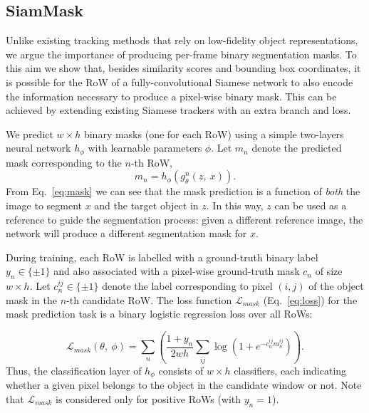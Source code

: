 \documentclass[10pt,twocolumn,letterpaper]{article}
\newcommand{\mypar}[1]{\smallskip\noindent {\bf #1}\enskip}
\begin{document}
\subsection{SiamMask}
\label{sec:siammask}
Unlike existing tracking methods that rely on low-fidelity object representations, we argue the importance of producing per-frame binary segmentation masks.
To this aim we show that, besides similarity scores and bounding box coordinates, it is possible for the RoW of a fully-convolutional Siamese network to also encode the information necessary to produce a pixel-wise binary mask.
This can be achieved by extending existing Siamese trackers with an extra branch and loss.

We predict $w{\times}h$ binary masks (one for each RoW) using a simple two-layers neural network $h_{\phi}$ with learnable parameters $\phi$.
Let $m_{n}$ denote the predicted mask corresponding to the $n$-th RoW,
\begin{equation}\label{eq:mask}
m_{n} = h_{\phi}(g_{\theta}^{n}(z,~x)).
\end{equation}
From Eq.~\ref{eq:mask} we can see that the mask prediction is a function of \emph{both} the image to segment $x$ and the target object in $z$.
In this way, $z$ can be used as a reference to guide the segmentation process:
given a different reference image, the network will produce a different segmentation mask for $x$.

\mypar{Loss function.}
During training, each RoW is labelled with a ground-truth binary label $y_{n} \in \{\pm 1\}$ and also associated with a pixel-wise ground-truth mask $c_n$ of size $w{\times}h$.
Let $c^{ij}_{n} \in \{\pm 1\}$ denote the label corresponding to pixel $(i,j)$ of the object mask in the $n$-th candidate RoW.
The loss function $\mathcal{L}_{mask}$ (Eq.~\ref{eq:loss}) for the mask prediction task is a binary logistic regression loss over all RoWs:

\begin{equation}\label{eq:loss}
		\mathcal{L}_{mask}(\theta,~\phi) =  \sum_{n} (\frac{1+y_{n}}{2wh}\sum_{ij} \log (1 + e^{-c^{ij}_{n}m_{n}^{ij}}
		)).
\end{equation}
Thus, the classification layer of $h_{\phi}$ consists of $w{\times}h$ classifiers, each indicating whether a given pixel belongs to the object in the candidate window or not.
Note that $\mathcal{L}_{mask}$ is considered only for positive RoWs (\ie with $y_{n}=1$).
\end{document}
